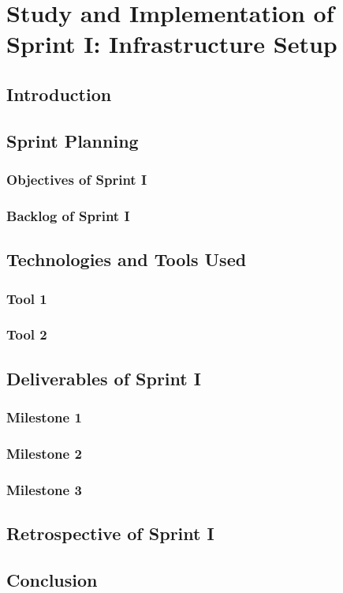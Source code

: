 \documentclass[a4paper,12pt]{report}
\begin{document}
\chapter[Sprint I]{Study and Implementation of Sprint I: Infrastructure Setup}

\minitoc
\section{Introduction}
\section{Sprint Planning}
\subsection{Objectives of Sprint I}
\subsection{Backlog of Sprint I}
\section{Technologies and Tools Used}
\subsection{Tool 1}
\subsection{Tool 2}
\section{Deliverables of Sprint I}
\subsection{Milestone 1}
\subsection{Milestone 2}
\subsection{Milestone 3}
\section{Retrospective of Sprint I}
\section{Conclusion}
\end{document}
